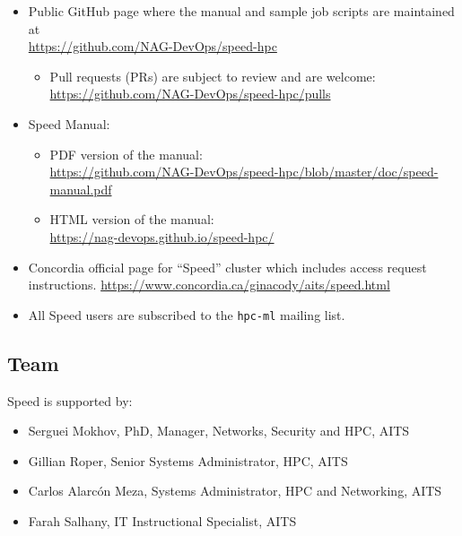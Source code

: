 \documentclass{easychair}
\begin{document}
\begin{itemize}
	\item
	Public GitHub page where the manual and sample job scripts are maintained at\\
	\url{https://github.com/NAG-DevOps/speed-hpc}
		\begin{itemize}
			\item Pull requests (PRs) are subject to review and are welcome:\\
			\url{https://github.com/NAG-DevOps/speed-hpc/pulls}
		\end{itemize}

	\item
	Speed Manual:
		\begin{itemize}
			\item PDF version of the manual:\\
			\url{https://github.com/NAG-DevOps/speed-hpc/blob/master/doc/speed-manual.pdf}
			
			\item HTML version of the manual:\\
			\url{https://nag-devops.github.io/speed-hpc/}
		\end{itemize}

	\item
	Concordia official page for ``Speed'' cluster which includes access request instructions.
	\url{https://www.concordia.ca/ginacody/aits/speed.html}

	\item
	All Speed users are subscribed to the \texttt{hpc-ml} mailing list.

\end{itemize}

\nocite{speed-intro-preso}

\subsection{Team}
\label{sect:speed-team}

Speed is supported by:
\begin{itemize}
	\item 
	Serguei Mokhov, PhD, Manager, Networks, Security and HPC, AITS
	\item 
	Gillian Roper, Senior Systems Administrator, HPC, AITS
	\item 
	Carlos Alarcón Meza, Systems Administrator, HPC and Networking, AITS
	\item 
	Farah Salhany, IT Instructional Specialist, AITS
\end{itemize}
\end{document}
